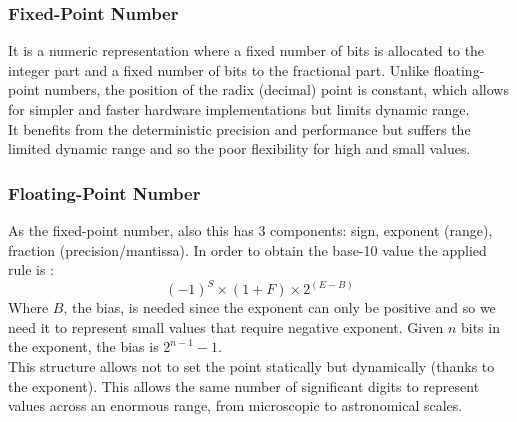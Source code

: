 \subsubsection{Fixed-Point Number}
It is a numeric representation where a fixed number of bits is allocated to the integer part and a fixed number of bits to the fractional part. Unlike floating-point numbers, the position of the radix (decimal) point is constant, which allows for simpler and faster hardware implementations but limits dynamic range.\\
It benefits from the deterministic precision and performance but suffers the limited dynamic range and so the poor flexibility for high and small values.

\subsubsection{Floating-Point Number}
As the fixed-point number, also this has 3 components: sign, exponent (range), fraction (precision/mantissa). In order to obtain the base-10 value the applied rule is :
$$(-1)^S × (1 + F) × 2^{(E - B)}$$
Where $B$, the bias, is needed since the exponent can only be positive and so we need it to represent small values that require negative exponent. Given $n$ bits in the exponent, the bias is $2^{n-1} - 1$.\\
This structure allows not to set the point statically but dynamically (thanks to the exponent). This allows the same number of significant digits to represent values across an enormous range, from microscopic to astronomical scales.

